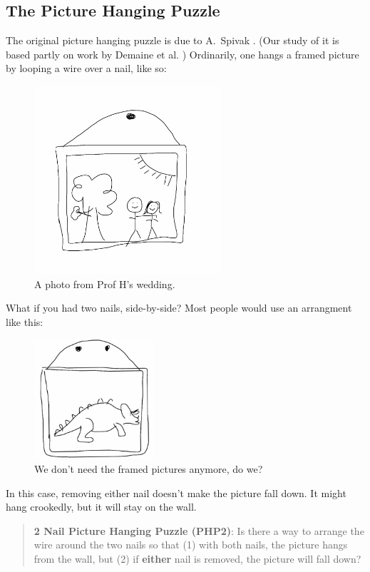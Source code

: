 \documentclass[12pt,letterpaper]{article}
\theoremstyle{definition}
\begin{document}
\subsection*{The Picture Hanging Puzzle}
The original picture hanging puzzle is due to A.~Spivak \cite{Spivak}.
(Our study of it is based partly on work by Demaine et al. \cite{Demaine})
Ordinarily, one hangs a framed picture by looping a wire over a nail, like so:
\begin{figure}[h]
    \centering
    \includegraphics[height=2.75in]{phppics/wedding.png}
    \caption{A photo from Prof H's wedding.}
\end{figure}
 
\clearpage
 
What if you had two nails, side-by-side? 
Most people would use an arrangment like this:
\begin{figure}[ht]
    \centering
    \includegraphics[height=1.75in]{phppics/dinosaur}
    \caption{We don't need the framed pictures anymore, do we?}
\end{figure}

In this case, removing either nail doesn't make the picture fall down. 
It might hang crookedly, but it will stay on the wall.

\begin{quotation}
\noindent
\textbf{2 Nail Picture Hanging Puzzle (PHP2)}:
Is there a way to arrange the wire around the two nails so that (1) with both nails, the picture hangs from the wall, but (2) if \textbf{either} nail is removed, the picture will fall down?
\end{quotation}
\end{document}
